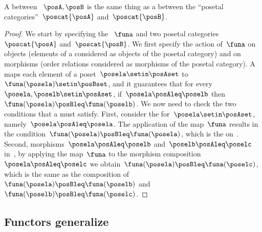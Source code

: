 \begin{lemma}
    \label{lem:posetfunctor}
    A  between ~$\posA,\posB$ is the same thing as a  between the ``posetal categories''~$\poscat{\posA}$ and~$\poscat{\posB}$.
\end{lemma}
\begin{proof}
    We start by specifying the ~$\funa$ and two posetal categories~$\poscat{\posA}$ and~$\poscat{\posB}$.
    We first specify the action of~$\funa$ on objects (elements of a  considered as objects of the posetal category) and on morphisms (order relations considered as morphisms of the posetal category).
    A  maps each element of a poset~$\posela\setin \posAset$ to~$\funa(\posela) \setin \posBset$, and it guarantees that for every~$\posela,\poselb\setin \posAset$, if~$\posela\posAleq \poselb$ then~$\funa(\posela)\posBleq \funa(\poselb)$.
    We now need to check the two conditions that a  must satisfy.
    First, consider the  for~$\posela\setin \posAset$, namely~$\posela \posAleq \posela$.
    The application of the map~$\funa$ results in the condition~$\funa(\posela)\posBleq \funa(\posela)$, which is the  on~\posB.
    Second, morphisms~$\posela\posAleq \poselb$ and~$\poselb\posAleq \poselc$ in~\posA, by applying the map~$\funa$ to the morphism composition~$\posela\posAleq \poselc$ we obtain~$\funa(\posela)\posBleq \funa(\poselc)$, which is the same as the composition of~$\funa(\posela)\posBleq \funa(\poselb)$ and~$\funa(\poselb)\posBleq \funa(\poselc)$.
\end{proof}



\subsection[\dots as \SY{semicategory actions}]{Functors generalize }


